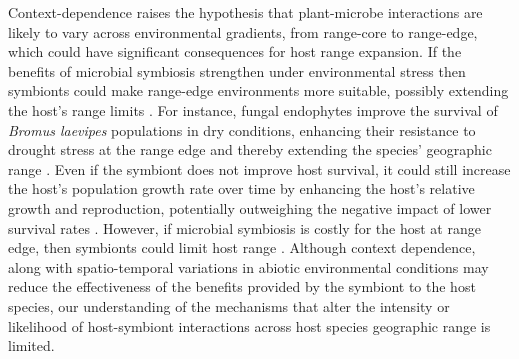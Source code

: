 \documentclass[11pt]{article}
\begin{document}
Context-dependence raises the hypothesis that plant-microbe interactions are likely to vary across environmental gradients, from range-core to range-edge, which could have significant consequences for host range expansion.
If the benefits of microbial symbiosis strengthen under environmental stress then symbionts could make range-edge environments more suitable, possibly extending the host’s range limits \citep{allsup2023shifting,rudgers2020climate}.
For instance, fungal endophytes improve the survival of \emph{Bromus laevipes} populations in dry conditions, enhancing their resistance to drought stress at the range edge and thereby extending the species' geographic range \citep{david2019soil,afkhami2014mutualist}.
Even if the symbiont does not improve host survival, it could still increase the host's population growth rate over time by enhancing the host's relative growth and reproduction, potentially outweighing the negative impact of lower survival rates \citep{yule2013costs}.
However, if microbial symbiosis is costly for the host at range edge, then symbionts could limit host range \citep{benning2021microbes,benning2021plant,bennett2022costs}.
Although context dependence, along with spatio-temporal variations in abiotic environmental conditions may reduce the effectiveness of the benefits provided by the symbiont to the host species, our understanding of the mechanisms that alter the intensity or likelihood of host-symbiont interactions across host species geographic range is limited.
\end{document}
